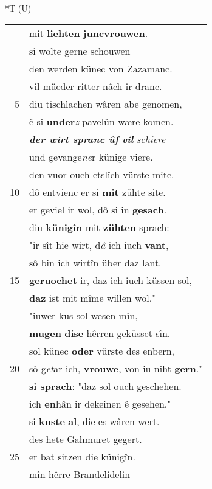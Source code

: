 \documentclass[8pt,a4paper,notitlepage]{article}
\begin{document}
\begin{table}[ht]
\begin{minipage}[t]{0.5\linewidth}
\end{minipage}
\hspace{0.5cm}
\begin{minipage}[t]{0.5\linewidth}
\small
\begin{center}*T (U)
\end{center}
\begin{tabular}{rl}
 & mit \textbf{liehten} \textbf{juncvrouwen}.\\ 
 & si wolte gerne schouwen\\ 
 & den werden künec von Zazamanc.\\ 
 & vil müeder ritter nâch ir dranc.\\ 
5 & diu tischlachen wâren abe genomen,\\ 
 & ê si \textbf{under}\textit{z} pavelûn wære komen.\\ 
 & \textit{\textbf{der wirt spranc ûf}} \textit{\textbf{vil}} \textit{schiere}\\ 
 & und gevange\textit{ne}r künige viere.\\ 
 & den vuor ouch etslîch vürste mite.\\ 
10 & dô entvienc er si \textbf{mit} zühte site.\\ 
 & er geviel ir wol, dô si in \textbf{gesach}.\\ 
 & diu \textbf{künigîn} mit \textbf{zühten} sprach:\\ 
 & "ir sît hie wirt, d\textit{â} ich iuch \textbf{vant},\\ 
 & sô bin ich wirtîn über daz lant.\\ 
15 & \textbf{geruochet} ir, daz ich iuch küssen sol,\\ 
 & \textbf{daz} ist mit mîme willen wol."\\ 
 & "iuwer kus sol wesen mîn,\\ 
 & \textbf{mugen} \textbf{dise} hêrren geküsset sîn.\\ 
 & sol künec \textbf{oder} vürste des enbern,\\ 
20 & sô g\textit{et}ar ich, \textbf{vrouwe}, von iu niht \textbf{gern}."\\ 
 & \textbf{si sprach}: "daz sol ouch geschehen.\\ 
 & ich \textbf{en}hân ir dekeinen ê gesehen."\\ 
 & si \textbf{kuste} \textbf{al}, die es wâren wert.\\ 
 & des hete Gahmuret gegert.\\ 
25 & er bat sitzen die künigîn.\\ 
 & mîn hêrre Brandelidelin\\ 

\end{tabular}
\end{minipage}
\end{table}
\end{document}

